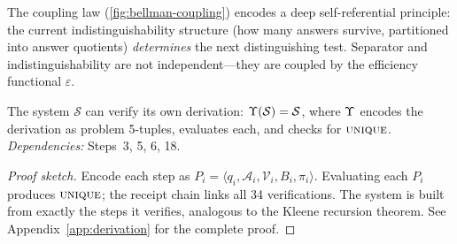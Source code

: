 

\begin{remark}
\label{rem:coupling}
The coupling law (\cref{fig:bellman-coupling}) encodes a deep
self-referential principle:
the current indistinguishability structure (how many answers survive,
partitioned into answer quotients) \emph{determines} the next
distinguishing test.  Separator and indistinguishability are not
independent---they are coupled by the efficiency functional $\varepsilon$.
\end{remark}

\begin{theorem}[Step 19 --- Self-Hosting and Replay: $\SelfHost = \mathcal{S}$]
\label{thm:self-hosting}
The system $\mathcal{S}$ can verify its own derivation: $\Upsilon(\mathcal{S}) = \mathcal{S}$,
where $\Upsilon$ encodes the derivation as problem 5-tuples, evaluates each, and checks for $\textsc{unique}$.
\emph{Dependencies:} Steps~3, 5, 6, 18.
\begin{proof}[Proof sketch]
Encode each step as $P_i = \langle q_i, \mathcal{A}_i, \mathcal{V}_i, B_i, \pi_i \rangle$.  Evaluating each $P_i$ produces $\textsc{unique}$; the receipt chain links all 34 verifications.  The system is built from exactly the steps it verifies, analogous to the Kleene recursion theorem.
See Appendix~\ref{app:derivation} for the complete proof.
\end{proof}
\end{theorem}


